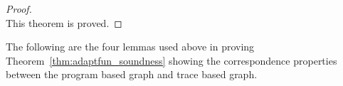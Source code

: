\begin{proof}
%
%
%
%
\\
This theorem is proved.
\end{proof}
The following are the four lemmas used above in proving Theorem~\ref{thm:adaptfun_soundness}
 showing the correspondence properties between the program based graph and trace based graph.
